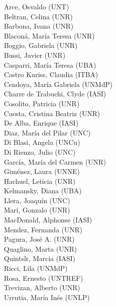 \documentclass[12pt,a4paper]{article}
\begin{document}
\vspace{0.5cm}

\noindent {\centerline{\Large\textbf{\textcolor{ultramarine}{Comité Científico}}}}
\bigbreak

\begin{multicols}{2}
\noindent Arce, Osvaldo (UNT) \\
Beltran, Celina (UNR) \\
Barbona, Ivana (UNR) \\
Blaconá, María Teresa (UNR) \\
Boggio, Gabriela (UNR) \\
Bussi, Javier (UNR) \\
Casparri, María Teresa (UBA) \\
Castro Kuriss, Claudia (ITBA) \\
Cendoya, María Gabriela (UNMdP) \\
Charre de Trabuchi, Clyde (IASI) \\
Cosolito, Patricia (UNR) \\
Cuesta, Cristina Beatriz (UNR) \\
De Alba, Enrique (IASI) \\
Diaz, María del Pilar (UNC) \\
Di Blasi, Angela (UNCu) \\
Di Rienzo, Julio (UNC) \\
García, María del Carmen (UNR) \\
Giménez, Laura (UNNE) \\
Hachuel, Leticia (UNR) \\
Kelmansky, Diana (UBA) \\
Llera, Joaquín (UNC) \\
Marí, Gonzalo (UNR) \\
MacDonald, Alphonse (IASI) \\
Mendez, Fernanda (UNR) \\
Pagura, José A. (UNR) \\
Quaglino, Marta (UNR) \\
Quintslr, Marcia (IASI) \\
Ricci, Lila (UNMdP) \\
Rosa, Ernesto (UNTREF) \\
Trevizan, Alberto (UNR) \\
Urrutia, María Inés (UNLP) \\
\end{multicols}

%
\end{document}
